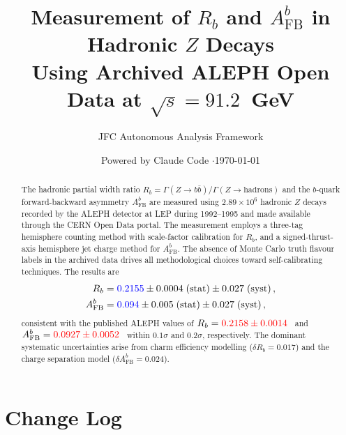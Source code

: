 \documentclass[11pt,a4paper]{article}
\title{Measurement of $R_b$ and $A_\mathrm{FB}^b$ in Hadronic $Z$ Decays \\
  Using Archived ALEPH Open Data at $\sqrt{s} = 91.2$~GeV}
\author{JFC Autonomous Analysis Framework}
\date{Powered by Claude Code \quad$\cdot$\quad \today}
\newcommand{\measured}[1]{\textcolor{blue}{#1}}
\newcommand{\external}[1]{\textcolor{red}{#1}}
\begin{document}
\maketitle

\begin{abstract}
The hadronic partial width ratio
$R_b = \Gamma(Z \to b\bar{b}) / \Gamma(Z \to \mathrm{hadrons})$
and the $b$-quark forward-backward asymmetry $A_\mathrm{FB}^b$ are
measured using $2.89 \times 10^6$ hadronic $Z$ decays recorded by the
ALEPH detector at LEP during 1992--1995 and made available through the
CERN Open Data portal.  The measurement employs a three-tag hemisphere
counting method with scale-factor calibration for $R_b$, and a
signed-thrust-axis hemisphere jet charge method for $A_\mathrm{FB}^b$.
The absence of Monte Carlo truth flavour labels in the archived data
drives all methodological choices toward self-calibrating techniques.
The results are
\begin{align*}
  R_b &= \measured{0.2155} \pm 0.0004\;\mathrm{(stat)}
         \pm 0.027\;\mathrm{(syst)}\,,\\
  A_\mathrm{FB}^b &= \measured{0.094} \pm 0.005\;\mathrm{(stat)}
         \pm 0.027\;\mathrm{(syst)}\,,
\end{align*}
consistent with the published ALEPH values of
$R_b = \external{0.2158 \pm 0.0014}$~\cite{ALEPH:Rb:1996} and
$A_\mathrm{FB}^b = \external{0.0927 \pm 0.0052}$~\cite{ALEPH:AFBb}
within $0.1\sigma$ and $0.2\sigma$, respectively.
The dominant systematic uncertainties arise from charm efficiency
modelling ($\delta R_b = 0.017$) and the charge separation model
($\delta A_\mathrm{FB}^b = 0.024$).
\end{abstract}

\tableofcontents
\clearpage

\section*{Change Log}
\end{document}
